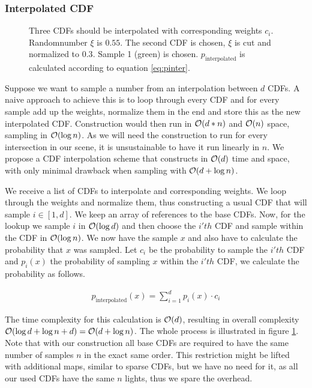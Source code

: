 \subsubsection{Interpolated CDF}
\label{sec:intcdf}
\begin{figure}[htb] 
	\centering
    
    \caption{Three CDFs should be interpolated with corresponding weights $c_i$. Randomnumber $\xi$ is $0.55$. The second CDF is chosen, $\xi$ is cut and normalized to $0.3$. Sample 1 (green) is chosen. $p_{\text{interpolated}}$ is calculated according to equation \ref{eq:pinter}.} 
    \label{fig:interpolatedCDF}
\end{figure}

Suppose we want to sample a number from an interpolation between $d$ CDFs. A naive approach to achieve this is to loop through every CDF and for every sample add up the weights, normalize them in the end and store this as the new interpolated CDF. Construction would then run in $\mathcal{O}(d * n)$ and $\mathcal{O}(n)$ space, sampling in $\mathcal{O}(\log{n})$. As we will need the construction to run for every intersection in our scene, it is unsustainable to have it run linearly in $n$. We propose a CDF interpolation scheme that constructs in $\mathcal{O}(d)$ time and space, with only minimal drawback when sampling with $\mathcal{O}(d + \log{n})$.

We receive a list of CDFs to interpolate and corresponding weights. We loop through the weights and normalize them, thus constructing a usual CDF that will sample $i \in [1,d]$. We keep an array of references to the base CDFs. Now, for the lookup we sample $i$ in $\mathcal{O}(\log{d})$ and then choose the $i'th$ CDF and sample within the CDF in $\mathcal{O}(\log{n})$. We now have the sample $x$ and also have to calculate the probability that $x$ was sampled. Let $c_i$ be the probability to sample the $i'th$ CDF and $p_i(x)$ the probability of sampling $x$ within the $i'th$ CDF, we calculate the probability as follows.

\begin{align}\label{eq:pinter}
    p_{\text{interpolated}}(x) = \sum_{i=1}^{d}p_{i}(x) \cdot c_i
\end{align}

The time complexity for this calculation is $\mathcal{O}(d)$, resulting in overall complexity $\mathcal{O}(\log{d} + \log{n} + d) = \mathcal{O}(d + \log{n})$. The whole process is illustrated in figure \ref{fig:interpolatedCDF}. Note that with our construction all base CDFs are required to have the same number of samples $n$ in the exact same order. This restriction might be lifted with additional maps, similar to sparse CDFs, but we have no need for it, as all our used CDFs have the same $n$ lights, thus we spare the overhead.

